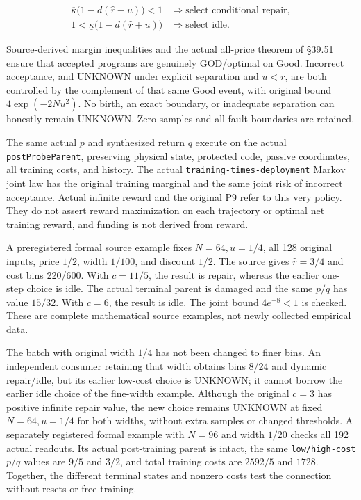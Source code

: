 \documentclass[
  english,
  11pt,
  oneside]{book}
\begin{document}
\[\begin{aligned}
\overline\kappa\bigl(1-d(\widehat r-u)\bigr)<1
&\Longrightarrow\text{select conditional repair},\\
1<\underline\kappa\bigl(1-d(\widehat r+u)\bigr)
&\Longrightarrow\text{select idle}.
\end{aligned}\]

Source-derived margin inequalities and the actual all-price theorem of §39.51 ensure that accepted programs are genuinely GOD/optimal on Good. Incorrect acceptance, and UNKNOWN under explicit separation and \(u<r\), are both controlled by the complement of that same Good event, with original bound \(4\exp(-2Nu^2)\). No birth, an exact boundary, or inadequate separation can honestly remain UNKNOWN. Zero samples and all-fault boundaries are retained.

The same actual \(p\) and synthesized return \(q\) execute on the actual \nolinkurl{postProbeParent}, preserving physical state, protected code, passive coordinates, all training costs, and history. The actual \nolinkurl{training-times-deployment} Markov joint law has the original training marginal and the same joint risk of incorrect acceptance. Actual infinite reward and the original P9 refer to this very policy. They do not assert reward maximization on each trajectory or optimal net training reward, and funding is not derived from reward.

A preregistered formal source example fixes \(N=64,u=1/4\), all 128 original inputs, price \(1/2\), width \(1/100\), and discount \(1/2\). The source gives \(\widehat r=3/4\) and cost bins 220/600. With \(c=11/5\), the result is repair, whereas the earlier one-step choice is idle. The actual terminal parent is damaged and the same \(p/q\) has value \(15/32\). With \(c=6\), the result is idle. The joint bound \(4e^{-8}<1\) is checked. These are complete mathematical source examples, not newly collected empirical data.

The batch with original width \(1/4\) has not been changed to finer bins. An independent consumer retaining that width obtains bins 8/24 and dynamic repair/idle, but its earlier low-cost choice is UNKNOWN; it cannot borrow the earlier idle choice of the fine-width example. Although the original \(c=3\) has positive infinite repair value, the new choice remains UNKNOWN at fixed \(N=64,u=1/4\) for both widths, without extra samples or changed thresholds. A separately registered formal example with \(N=96\) and width \(1/20\) checks all 192 actual readouts. Its actual post-training parent is intact, the same \nolinkurl{low/high-cost} \(p/q\) values are \(9/5\) and \(3/2\), and total training costs are \(2592/5\) and \(1728\). Together, the different terminal states and nonzero costs test the connection without resets or free training.
\end{document}
